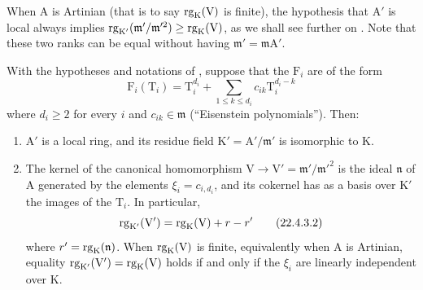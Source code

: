 \begin{remark}[22.4.2]
\label{0.22.4.2}
When $\mathrm{A}$ is Artinian (that is to say $\operatorname{rg}_\mathrm{K}(\mathrm{V})$ is finite), the hypothesis that $\mathrm{A}'$ is local always implies $\operatorname{rg}_{\mathrm{K}'}(\mathfrak{m}'/\mathfrak{m}'^2)\geq\operatorname{rg}_\mathrm{K}(\mathrm{V})$, as we shall see further on .
Note that these two ranks can be equal without having $\mathfrak{m}'=\mathfrak{m}\mathrm{A}'$.
\end{remark}

\begin{proposition}[22.4.3]
\label{0.22.4.3}
With the hypotheses and notations of , suppose that the $\mathrm{F}_i$ are of the form
\[
\label{0.22.4.3.1}
  \mathrm{F}_i(\mathrm{T}_i)=\mathrm{T}_i^{d_i}+\sum_{1\leq k\leq d_i}c_{ik}\mathrm{T}_i^{d_i-k}
  \tag{22.4.3.1}
\]
where $d_i\geq 2$ for every $i$ and $c_{ik}\in\mathfrak{m}$ (``Eisenstein polynomials'').
Then:
\begin{enumerate}
  \item[\rm{(i)}] $\mathrm{A}'$ is a local ring, and its residue field $\mathrm{K}'=\mathrm{A}'/\mathfrak{m}'$ is isomorphic to $\mathrm{K}$.


  \item[\rm{(ii)}] The kernel of the canonical homomorphism $\mathrm{V}\to\mathrm{V}'=\mathfrak{m}'/\mathfrak{m}'^2$ is the ideal $\mathfrak{n}$ of $\mathrm{A}$ generated by the elements $\xi_i=c_{i,d_i}$, and its cokernel has as a basis over $\mathrm{K}'$ the images of the $\mathrm{T}_i$.
  In particular,
  \begin{equation}
  \label{0.22.4.3.2}
    \operatorname{rg}_{\mathrm{K}'}(\mathrm{V}')=\operatorname{rg}_\mathrm{K}(\mathrm{V})+r- r'
    \tag{22.4.3.2}
  \end{equation}
  where $r'=\operatorname{rg}_\mathrm{K}(\mathfrak{n})$.
  When $\operatorname{rg}_\mathrm{K}(\mathrm{V})$ is finite, equivalently when $\mathrm{A}$ is Artinian, equality $\operatorname{rg}_{\mathrm{K}'}(\mathrm{V}')=\operatorname{rg}_\mathrm{K}(\mathrm{V})$ holds if and only if the $\xi_i$ are linearly independent over $\mathrm{K}$.
\end{enumerate}
\end{proposition}

